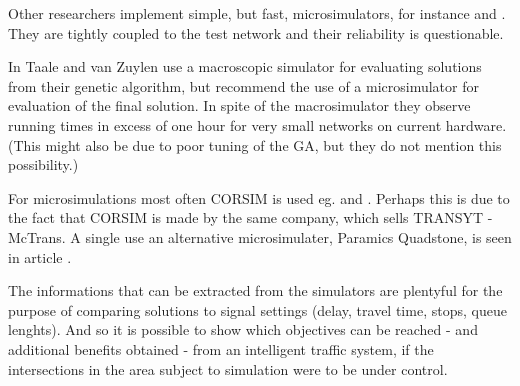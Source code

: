 Other researchers implement simple, but fast, microsimulators, for instance \cite{12} and \cite{42}. They are tightly coupled to the test network and their reliability is questionable.

In \cite{31} Taale and van Zuylen use a macroscopic simulator for evaluating solutions from their genetic algorithm, but recommend the use of a microsimulator for evaluation of the final solution. In spite of the macrosimulator they observe running times in excess of one hour for very small networks on current hardware. (This might also be due to poor tuning of the GA, but they do not mention this possibility.)

For microsimulations most often CORSIM is used eg.  \cite{1} and \cite{35}. Perhaps this is due to the fact that CORSIM is made by the same company, which sells TRANSYT - McTrans. A single use an alternative microsimulater, Paramics Quadstone, is seen in article \cite{21}.

The informations that can be extracted from the simulators are plentyful for the purpose of comparing solutions to signal settings (delay, travel time, stops, queue lenghts). And so it is possible to show which objectives can be reached - and additional benefits obtained - from an intelligent traffic system, if the intersections in the area subject to simulation were to be under control.
